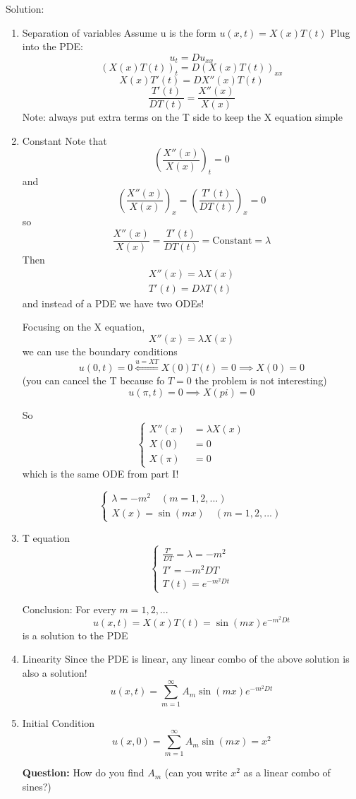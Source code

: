\documentclass[12pt]{article}
\begin{document}
Solution:
\begin{enumerate}
    \item Separation of variables 
    Assume u is the form $u(x, t) = X(x)T(t)$
    Plug into the PDE:
    \[u_t = Du_{xx}\]
    \[(X(x)T(t))_t = D(X(x)T(t))_{xx}\]
    \[X(x)T'(t) = DX''(x)T(t)\]
    \[\frac{T'(t)}{DT(t)} = \frac{X''(x)}{X(x)}\]
    Note: always put extra terms on the T side to keep the X equation simple

    \item Constant 
    Note that 
    \[\left(\frac{X''(x)}{X(x)}\right)_t = 0\]
    and 
    \[\left(\frac{X''(x)}{X(x)}\right)_x = \left(\frac{T'(t)}{DT(t)}\right)_x = 0\]
    so 
    \[\frac{X''(x)}{X(x)} = \frac{T'(t)}{DT(t)} = \text{Constant} = \lambda\]
    Then 
    \begin{align*}
        X''(x) = \lambda X(x)\\
        T'(t) = D\lambda T(t)
    \end{align*}
    and instead of a PDE we have two ODEs!

    Focusing on the X equation, 
    \[X''(x) = \lambda X(x)\]
    we can use the boundary conditions
    \[u(0, t) = 0 \overset{u=XT}{\Longleftarrow} X(0)T(t)= 0 \implies X(0) =0\]
    (you can cancel the T because fo $T= 0$ the problem is not interesting)
    \[u(\pi, t) =0 \implies X(pi) = 0\]

    So 
    \[\begin{cases}
        X''(x) &= \lambda X(x)\\
        X(0) &= 0\\
        X(\pi) &= 0
    \end{cases}\]
    which is the same ODE from part I! 

    \[\begin{cases}
        \lambda = -m^2 \quad (m = 1, 2, ...)\\
        X(x) = \sin(mx) \quad (m = 1, 2, ...)
    \end{cases}\]

    \item T equation 
    \[\begin{cases}
        \frac{T'}{DT} = \lambda = -m^2\\
        T' = -m^2DT\\
        T(t) = e^{-m^2 Dt}
    \end{cases}\]

    Conclusion: For every $m = 1, 2, ...$ 
    \[u(x, t) = X(x)T(t) = \sin(mx)e^{-m^2Dt}\]
    is a solution to the PDE 

    \item Linearity
    Since the PDE is linear, any linear combo of the above solution is also a solution!
    \[u(x, t) = \sum_{m=1}^\infty A_m \sin(mx)e^{-m^2Dt}\]

    \item Initial Condition 
    \[u(x, 0) = \sum_{m=1}^\infty A_m \sin(mx) = x^2\]

    \textbf{Question:} How do you find $A_m$ (can you write $x^2$ as a linear combo of sines?)
\end{enumerate}
\end{document}
